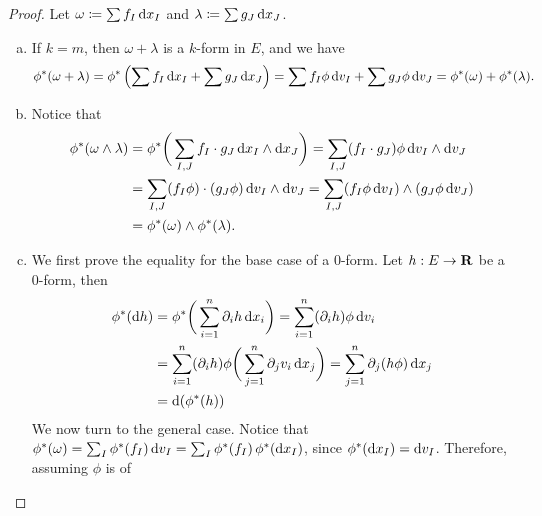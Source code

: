 \begin{proof}
    Let \(\omega \coloneq \sum f_I\, \mathrm{d} x_I\) and \(\lambda \coloneq \sum g_J\,
    \mathrm{d} x_J\).
    \begin{enumerate}[(a)]\setlength\itemsep{0em}
        \item If \(k = m\), then \(\omega + \lambda\) is a \(k\)-form in \(E\), and we
              have
              \[
                  \phi^{*}(\omega + \lambda)
                  = \phi^{*} \left( \sum f_I\, \mathrm{d} x_I + \sum g_J\, \mathrm{d} x_J \right)
                  = \sum f_I \phi\, \mathrm{d} v_I + \sum g_J \phi\, \mathrm{d} v_J
                  = \phi^{*}(\omega) + \phi^{*}(\lambda).
              \]
        \item Notice that
              \begin{align*}
                  \phi^{*}(\omega \wedge \lambda)
                   & = \phi^{*} \bigg(
                  \sum_{I, J} f_I \cdot g_J\, \mathrm{d} x_I \wedge \mathrm{d} x_J
                  \bigg)
                  = \sum_{I, J} (f_I \cdot g_J) \phi\, \mathrm{d} v_I \wedge \mathrm{d} v_J           \\
                   & = \sum_{I, J} (f_I \phi) \cdot (g_J \phi)\, \mathrm{d} v_I \wedge \mathrm{d} v_J
                  = \sum_{I, J} (f_I \phi\, \mathrm{d} v_I) \wedge (g_J \phi\, \mathrm{d} v_J)        \\
                   & = \phi^{*}(\omega) \wedge \phi^{*}(\lambda).
              \end{align*}
        \item We first prove the equality for the base case of a \(0\)-form. Let \(h: E
              \to \mathbf{R}\) be a \(0\)-form, then
              \begin{align*}
                  \phi^{*} (\mathrm{d} h)
                   & = \phi^{*} \bigg( \sum_{i=1}^n \partial_i h\, \mathrm{d} x_i \bigg)
                  = \sum_{i=1}^n (\partial_i h) \phi\, \mathrm{d} v_i                    \\
                   & = \sum_{i=1}^n (\partial_i h) \phi
                  \bigg( \sum_{j=1}^{n} \partial_j v_i\, \mathrm{d} x_j \bigg)
                  = \sum_{j=1}^n \partial_j (h \phi)\, \mathrm{d} x_j                    \\
                   & = \mathrm{d} (\phi^{*}(h))
              \end{align*}
              We now turn to the general case. Notice that \(\phi^{*}(\omega) = \sum_I
              \phi^{*}(f_I)\, \mathrm{d} v_I = \sum_I \phi^{*}(f_I)\, \phi^{*}(\mathrm{d} x_{I})\),
              since \(\phi^{*} (\mathrm{d} x_I) = \mathrm{d} v_I\). Therefore, assuming \(\phi\) is of

\end{enumerate}
\end{proof}
